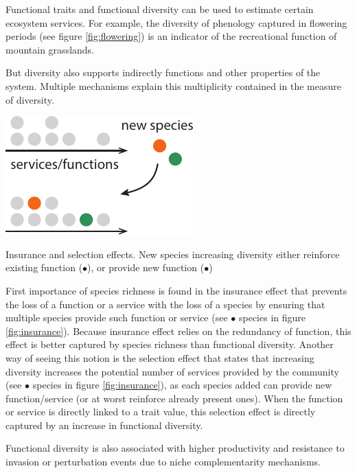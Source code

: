 Functional traits and functional diversity can be used to estimate certain ecosystem services. For example, the diversity of phenology captured in flowering periods (see figure \ref{fig:flowering}) is an indicator of the recreational function of mountain grasslands.

But diversity also supports indirectly functions and other properties of the system. Multiple mechanisms explain this multiplicity contained in the measure of diversity. 

\begin{marginfigure}
    \includegraphics{./Figures/insurance_m.pdf}
  \caption[Diversity insurance effect]{Insurance and selection effects. New species increasing diversity either reinforce existing function (\textcolor{myOrange}{$\bullet$}), or provide new function (\textcolor{myGreen}{$\bullet$})}
  \label{fig:insurance}
\end{marginfigure}


First importance of species richness is found in the insurance effect that prevents the loss of a function or a service with the loss of a species by ensuring that multiple species provide such function or service (see \textcolor{myOrange}{$\bullet$} species in figure \ref{fig:insurance}). Because insurance effect relies on the redundancy of function, this effect is better captured by species richness than functional diversity. Another way of seeing this notion is the selection effect that states that increasing diversity increases the potential number of services provided by the community (see \textcolor{myGreen}{$\bullet$} species in figure \ref{fig:insurance}), as each species added can provide new function/service (or at worst reinforce already present ones). When the function or service is directly linked to a trait value, this selection effect is directly captured by an increase in functional diversity.

Functional diversity is also associated with higher productivity and resistance to invasion or perturbation events due to niche complementarity mechanisms.

